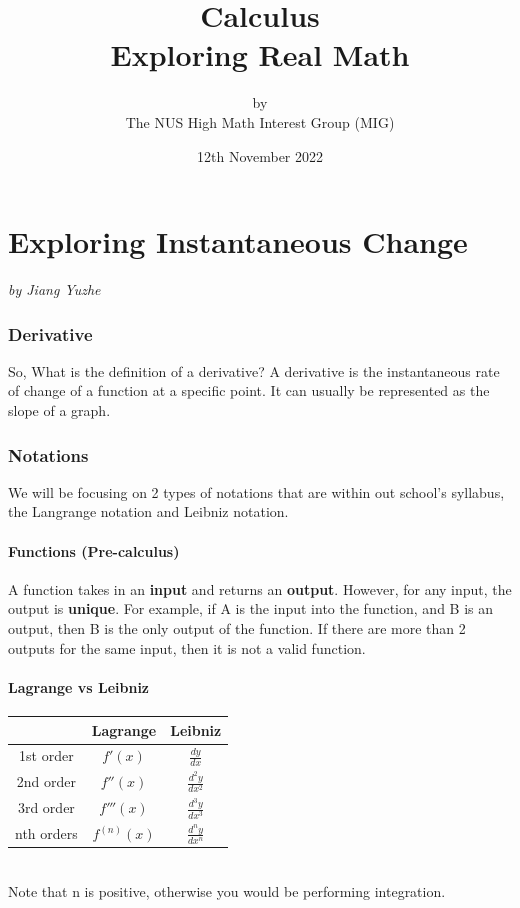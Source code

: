 \documentclass[a4paper,12pt,oneside]{book}
\title{%
  \Huge Calculus \\
  \LARGE  Exploring \textbf{Real} Math
  }
\author{by \\
\Large The NUS High Math Interest Group (MIG) \\
}
\date{\Large 12th November 2022}
\begin{document}
\maketitle

\tableofcontents


\chapter{Exploring Instantaneous Change}
\vspace{-30pt}
\large \textit{by Jiang Yuzhe}

\subsection{Derivative}
So, What is the definition of a derivative?
A derivative is the instantaneous rate of change of a function at a specific point. It can usually be represented as the slope of a graph.

\subsection{Notations}
We will be focusing on 2 types of notations that are within out school's syllabus, the Langrange notation and Leibniz notation. 
\subsubsection{Functions (Pre-calculus)}
A function takes in an \textbf{input} and returns an \textbf{output}. However, for any input, the output is \textbf{unique}. For example, if A is the input into the function, and B is an output, then B is the only output of the function. If there are more than 2 outputs for the same input, then it is not a valid function. 
\subsubsection{Lagrange vs Leibniz}
\begin{tabular}{|c|c|c|}
     \hline
     & Lagrange & Leibniz \\
     \hline
     1st order & $f'(x)$& $\frac{dy}{dx}$\\[2ex]
     \hline
     2nd order & $f''(x)$& $\frac{d^2y}{dx^2}$\\[2ex]
     \hline
     3rd order & $f'''(x)$& $\frac{d^3y}{dx^3}$\\[2ex]
     \hline
     nth orders & $f^{(n)}(x)$& $\frac{d^ny}{dx^n}$\\[2ex]
     \hline
\end{tabular}
\smallskip\\
Note that n is positive, otherwise you would be performing integration.
\end{document}
